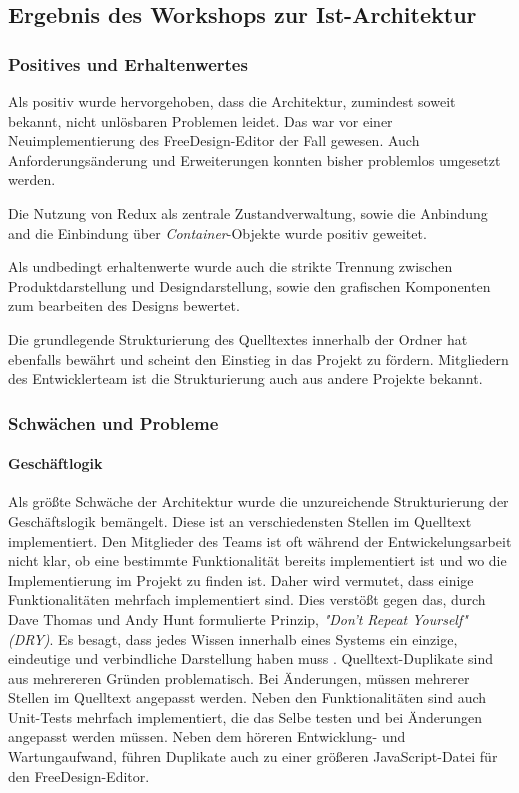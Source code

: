\subsection{Ergebnis des Workshops zur Ist-Architektur}

\subsubsection{Positives und Erhaltenwertes}

Als positiv wurde hervorgehoben, dass die Architektur, zumindest soweit bekannt, nicht unlösbaren Problemen leidet. 
Das war vor einer Neuimplementierung des FreeDesign-Editor der Fall gewesen. 
Auch Anforderungsänderung und Erweiterungen konnten bisher problemlos umgesetzt werden. 

Die Nutzung von Redux als zentrale Zustandverwaltung, sowie die Anbindung and die Einbindung über \textit{Container}-Objekte wurde positiv geweitet. 

Als undbedingt erhaltenwerte wurde auch die strikte Trennung zwischen Produktdarstellung und Designdarstellung, sowie den grafischen Komponenten zum bearbeiten des Designs bewertet. 

Die grundlegende Strukturierung des Quelltextes innerhalb der Ordner hat ebenfalls bewährt und scheint den Einstieg in das Projekt zu fördern. 
Mitgliedern des Entwicklerteam ist die Strukturierung auch aus andere Projekte bekannt.

\subsubsection{Schwächen und Probleme}
\paragraph{Geschäftlogik}
Als größte Schwäche der Architektur wurde die unzureichende Strukturierung der Geschäftslogik bemängelt. Diese ist an verschiedensten Stellen im Quelltext implementiert. Den Mitglieder des Teams ist oft während der Entwickelungsarbeit nicht klar, ob eine bestimmte Funktionalität bereits implementiert ist und wo die Implementierung im Projekt zu finden ist. 
Daher wird vermutet, dass einige Funktionalitäten mehrfach implementiert sind. 
Dies verstößt gegen das, durch Dave Thomas und Andy Hunt formulierte Prinzip, \textit{"Don’t Repeat Yourself" (DRY)}. Es besagt, dass jedes Wissen innerhalb eines Systems ein einzige, eindeutige und verbindliche Darstellung haben muss \autocite[vgl.][30 - 31]{ThomasAndHunt2020}.  
Quelltext-Duplikate sind aus mehrereren Gründen problematisch. Bei Änderungen, müssen mehrerer Stellen im Quelltext angepasst werden. Neben den Funktionalitäten sind auch Unit-Tests mehrfach implementiert, die das Selbe testen und bei Änderungen angepasst werden müssen. Neben dem höreren Entwicklung- und Wartungaufwand, führen Duplikate auch zu einer größeren JavaScript-Datei für den FreeDesign-Editor. 

